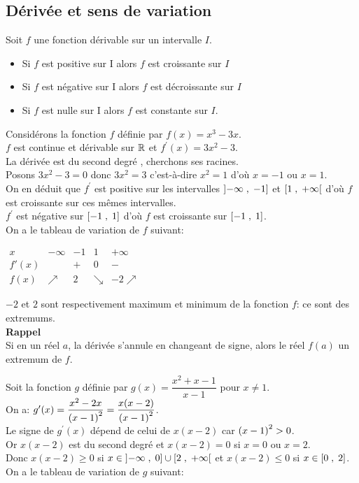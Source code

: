\subsection*{Dérivée et sens de variation}
\begin{theorem}
Soit $ f $ une fonction dérivable sur un intervalle $ I. $
\begin{itemize}
\item Si $ f $ est positive sur I alors  $f$ est  croissante sur $I$ 
\item Si $ f $ est négative sur I alors  $f$ est  décroissante sur $I$ 
\item Si  $ f $ est nulle  sur I alors  $f$ est  constante sur $I$. 
\end{itemize}
\end{theorem}
\begin{example}
Considérons la fonction $ f $ définie par $ f(x)=x^{3}-3x$.\\
$ f $  est continue et dérivable sur $ \mathbb{R} $  et  $ f^{\prime}(x)=3x^{2}-3$.\\
La dérivée est du second degré , cherchons ses racines.\\ Posons $3x^{2}-3=0   $ donc $ 3x^{2}=3 $ c'est-à-dire $ x^{2}=1$ d'où $x=-1 $ ou $x=1 $.\\
 On en déduit que $ f^{\prime} $ est positive sur les intervalles $ \left]-\infty \;, \;-1\right] $  et $ \left[1 \;,\; +\infty\right[ $  d'où $ f $ est croissante sur ces mêmes intervalles.\\
$ f^{\prime} $  est négative sur $ \left[-1\;,\; 1\right] $ d'où $ f $ est croissante sur $ \left[-1\;,\; 1\right] $. \\On a le tableau de variation de $ f $ suivant:
\begin{center}
$\begin{array}{c|cccc}
x & -\infty & -1 & 1 & +\infty \\
\hline
f'(x) &      & + & 0 & - \\
f(x)  & \nearrow & 2 & \searrow & -2 \nearrow
\end{array}$

\end{center}
$-2$   et  $2 $ sont respectivement maximum et minimum de la fonction $ f $: ce sont des extremums.\\
\textbf{Rappel}\\ Si en un réel $ a $, la dérivée s'annule en changeant de
signe, alors le réel $ f(a) $ un extremum de $ f $.
\end{example}
\begin{example} 
Soit la fonction $ g $ définie par $ g(x)=\dfrac{x^{2}+x-1}{x-1} $ pour $ x\neq1 $.\\
On a:\; $ g^{\prime}(x)=\dfrac{x^{2}-2x}{\left(x-1\right)^{2}} =\dfrac{x(x-2)}{\left(x-1\right)^{2}}$.\\ Le signe de $ g^{\prime}(x) $ dépend de celui de $ x(x-2) $  car $ \left(x-1\right)^{2}>0 $.\\ Or $ x(x-2) $ est du second degré et $ x(x-2)=0 $  si $ x=0$ ou $x=2 $.\\ Donc $ x(x-2) \geq0$  si $ x\in\left]-\infty \;, \;0\right] \cup \left[2 \;,\; +\infty\right[$\; et $ x(x-2)\leq 0$  si             $ x\in\left[0\;,\; 2\right] $.\\
On a le tableau de variation de $ g $ suivant:
\end{example}
